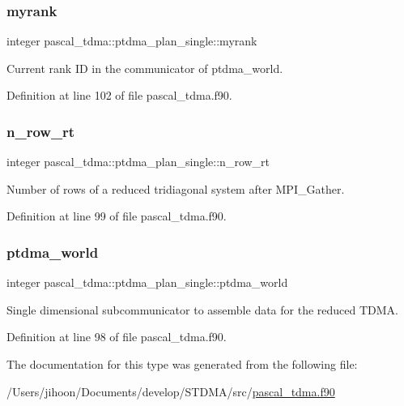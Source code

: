 \subsubsection{\texorpdfstring{myrank}{myrank}}
{\footnotesize\ttfamily integer pascal\+\_\+tdma\+::ptdma\+\_\+plan\+\_\+single\+::myrank}



Current rank ID in the communicator of ptdma\+\_\+world. 



Definition at line 102 of file pascal\+\_\+tdma.\+f90.

\mbox{\label{structpascal__tdma_1_1ptdma__plan__single_a91fd8fb919f9b7d3137b13fcaa55dc1b}} 
\subsubsection{\texorpdfstring{n\_row\_rt}{n\_row\_rt}}
{\footnotesize\ttfamily integer pascal\+\_\+tdma\+::ptdma\+\_\+plan\+\_\+single\+::n\+\_\+row\+\_\+rt}



Number of rows of a reduced tridiagonal system after M\+P\+I\+\_\+\+Gather. 



Definition at line 99 of file pascal\+\_\+tdma.\+f90.

\mbox{\label{structpascal__tdma_1_1ptdma__plan__single_a073cddefd8ef983b185b6727d8ad7de6}} 
\subsubsection{\texorpdfstring{ptdma\_world}{ptdma\_world}}
{\footnotesize\ttfamily integer pascal\+\_\+tdma\+::ptdma\+\_\+plan\+\_\+single\+::ptdma\+\_\+world}



Single dimensional subcommunicator to assemble data for the reduced T\+D\+MA. 



Definition at line 98 of file pascal\+\_\+tdma.\+f90.



The documentation for this type was generated from the following file\+:\begin{DoxyCompactItemize}
\item 
/\+Users/jihoon/\+Documents/develop/\+S\+T\+D\+M\+A/src/\mbox{\hyperlink{pascal__tdma_8f90}{pascal\+\_\+tdma.\+f90}}\end{DoxyCompactItemize}
